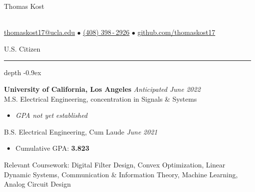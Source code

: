 \documentclass[11pt, letterpaper]{article}
\newcommand\smallspace{4pt}
\newcommand\indentlength{0.25in}
\def\Vhrulefill{\leavevmode\leaders\hrule height 1ex depth \dimexpr0.1pt-0.9ex\hfill\kern0pt}
\newenvironment{category}[1]
{
	\vspace{\smallspace}
	\noindent {\LARGE{\sc{#1}}} \hspace{2pt}
	\Vhrulefill
	\vspace{\smallspace}
	\begin{addmargin}[\indentlength]{0in}
	}
	{
	\end{addmargin}
	\vspace{\smallspace}
}
\begin{document}
	\begin{center}
		\begin{Huge}\begin{sc}Thomas Kost\end{sc}\end{Huge} \\
		\vspace{3pt}
		\href{mailto:thomaskost17@g.ucla.edu}{{thomaskost17@ucla.edu}} \hspace{0.05in} $\bullet$ \hspace{0.05in} \href{tel:14083982926}{(408) 398\,-\,2926}  \hspace{0.05in} $\bullet$ \hspace{0.05in} \href{https://github.com/thomaskost17}{{github.com/thomaskost17}}
		
		U.S. Citizen
	\end{center}
	
	\vspace{-3pt}
	\begin{category}{Education}
		
		\vspace{\smallspace}
		\noindent\textbf{University of California, Los Angeles} \hfill \textit{Anticipated June 2022} \\
		M.S. Electrical Engineering, concentration in Signals \& Systems
		\begin{itemize}
			\item \textit{GPA not yet established}
		\end{itemize}
		\vspace{\smallspace}
		B.S. Electrical Engineering, Cum Laude \hfill \textit{June 2021}
		\begin{itemize}
			\item Cumulative GPA: \textbf{3.823}
		\end{itemize}
		Relevant Coursework: Digital Filter Design, Convex Optimization, Linear Dynamic Systems, Communication \& Information Theory, Machine Learning, Analog Circuit Design
	\end{category}
	
\end{document}
